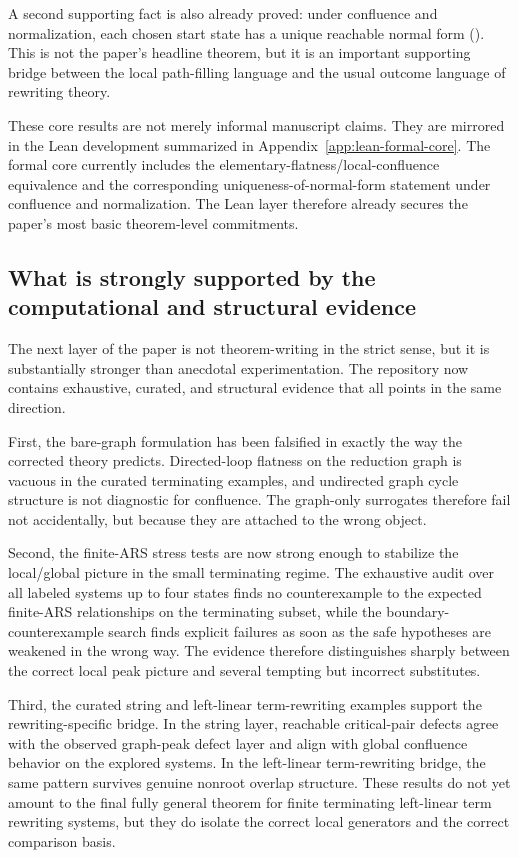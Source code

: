 \documentclass[11pt]{article}
\numberwithin{equation}{section}
\theoremstyle{definition}
\theoremstyle{remark}
\begin{document}
A second supporting fact is also already proved: under confluence and normalization, each chosen start state has a unique reachable normal form (). This is not the paper's headline theorem, but it is an important supporting bridge between the local path-filling language and the usual outcome language of rewriting theory.

These core results are not merely informal manuscript claims. They are mirrored in the Lean development summarized in Appendix~\ref{app:lean-formal-core}. The formal core currently includes the elementary-flatness/local-confluence equivalence and the corresponding uniqueness-of-normal-form statement under confluence and normalization. The Lean layer therefore already secures the paper's most basic theorem-level commitments.

\subsection{What is strongly supported by the computational and structural evidence}
\label{subsec:what-is-supported}

The next layer of the paper is not theorem-writing in the strict sense, but it is substantially stronger than anecdotal experimentation. The repository now contains exhaustive, curated, and structural evidence that all points in the same direction.

First, the bare-graph formulation has been falsified in exactly the way the corrected theory predicts. Directed-loop flatness on the reduction graph is vacuous in the curated terminating examples, and undirected graph cycle structure is not diagnostic for confluence. The graph-only surrogates therefore fail not accidentally, but because they are attached to the wrong object.

Second, the finite-ARS stress tests are now strong enough to stabilize the local/global picture in the small terminating regime. The exhaustive audit over all labeled systems up to four states finds no counterexample to the expected finite-ARS relationships on the terminating subset, while the boundary-counterexample search finds explicit failures as soon as the safe hypotheses are weakened in the wrong way. The evidence therefore distinguishes sharply between the correct local peak picture and several tempting but incorrect substitutes.

Third, the curated string and left-linear term-rewriting examples support the rewriting-specific bridge. In the string layer, reachable critical-pair defects agree with the observed graph-peak defect layer and align with global confluence behavior on the explored systems. In the left-linear term-rewriting bridge, the same pattern survives genuine nonroot overlap structure. These results do not yet amount to the final fully general theorem for finite terminating left-linear term rewriting systems, but they do isolate the correct local generators and the correct comparison basis.
\end{document}
